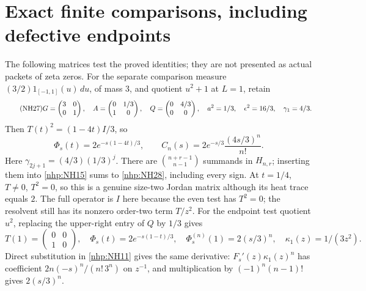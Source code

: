 \documentclass[11pt]{article}
\begin{document}
\section{Exact finite comparisons, including defective endpoints}

The following matrices test the proved identities; they
are not presented as actual packets of zeta zeros.
For the separate comparison measure
\((3/2)1_{[-1,1]}(u)\,du\), of mass \(3\), and quotient
\(u^2+1\) at \(L=1\), retain
\begin{equation}\tag{NH27}\label{nhp:NH27}
G=\begin{pmatrix}3&0\\0&1\end{pmatrix},\quad
A=\begin{pmatrix}0&1/3\\1&0\end{pmatrix},\quad
Q=\begin{pmatrix}0&4/3\\0&0\end{pmatrix},\quad
a^2=1/3,\quad \epsilon^2=16/3,\quad \gamma_1=4/3 .
\end{equation}
Then \(T(t)^2=(1-4t)I/3\), so
\begin{equation}\tag{NH28}\label{nhp:NH28}
\Phi_s(t)=2e^{-s(1-4t)/3},\qquad
C_n(s)=2e^{-s/3}\frac{(4s/3)^n}{n!}.
\end{equation}
Here \(\gamma_{2j+1}=(4/3)(1/3)^j\).
There are \(\binom{n+r-1}{n-1}\) summands in \(H_{n,r}\);
inserting them into \eqref{nhp:NH15} sums to
\eqref{nhp:NH28}, including every sign.
At \(t=1/4\), \(T\ne0\), \(T^2=0\), so this is a
genuine size-two Jordan matrix although its heat trace
equals \(2\). The full operator is \(I\) here because
the even test has \(T^2=0\); the resolvent still has
its nonzero order-two term \(T/z^2\).
For the endpoint test quotient \(u^2\), replacing the
upper-right entry of \(Q\) by \(1/3\) gives
\begin{equation}\tag{NH29}\label{nhp:NH29}
T(1)=\begin{pmatrix}0&0\\1&0\end{pmatrix},\quad
\Phi_s(t)=2e^{-s(1-t)/3},\quad
\Phi_s^{(n)}(1)=2(s/3)^n,\quad
\kappa_1(z)=1/(3z^2).
\end{equation}
Direct substitution in \eqref{nhp:NH11} gives the same
derivative: \(F_s'(z)\kappa_1(z)^n\) has coefficient
\(2n(-s)^n/(n!\,3^n)\) on \(z^{-1}\), and multiplication
by \((-1)^n(n-1)!\) gives \(2(s/3)^n\).
\end{document}

